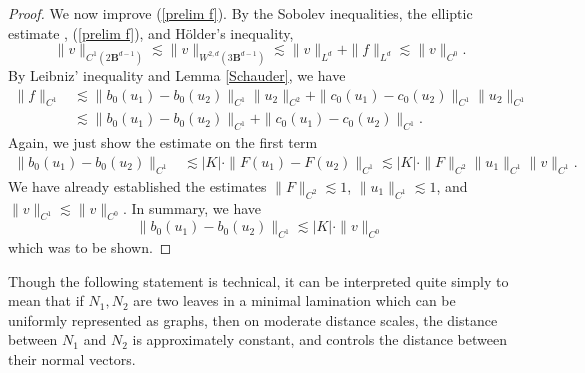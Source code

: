 \documentclass[reqno,11pt]{amsart}
\newcommand{\Ball}{\mathbf{B}}
\theoremstyle{definition}
\numberwithin{equation}{section}
\begin{document}
\begin{proof}
We now improve (\ref{prelim f}).
By the Sobolev inequalities, the elliptic estimate \cite[Theorem 9.11]{gilbarg2015elliptic}, (\ref{prelim f}), and H\"older's inequality,
$$\|v\|_{C^1(2\Ball^{d - 1})} \lesssim \|v\|_{W^{2, d}(3\Ball^{d - 1})} \lesssim \|v\|_{L^d} + \|f\|_{L^d} \lesssim \|v\|_{C^0}.$$
By Leibniz' inequality and Lemma \ref{Schauder}, we have 
\begin{align*}
\|f\|_{C^1} 
&\lesssim \|b_0(u_1) - b_0(u_2)\|_{C^1} \|u_2\|_{C^2} + \|c_0(u_1) - c_0(u_2)\|_{C^1} \|u_2\|_{C^1} \\
&\lesssim \|b_0(u_1) - b_0(u_2)\|_{C^1} + \|c_0(u_1) - c_0(u_2)\|_{C^1}.
\end{align*}
Again, we just show the estimate on the first term
\begin{align*}
\|b_0(u_1) - b_0(u_2)\|_{C^1}
&\lesssim |K| \cdot \|F(u_1) - F(u_2)\|_{C^1} \lesssim |K| \cdot \|F\|_{C^2} \|u_1\|_{C^1} \|v\|_{C^1}.
\end{align*}
We have already established the estimates $\|F\|_{C^2} \lesssim 1$, $\|u_1\|_{C^1} \lesssim 1$, and $\|v\|_{C^1} \lesssim \|v\|_{C^0}$.
In summary, we have
$$\|b_0(u_1) - b_0(u_2)\|_{C^1} \lesssim |K| \cdot \|v\|_{C^0}$$
which was to be shown.
\end{proof}

Though the following statement is technical, it can be interpreted quite simply to mean that if $N_1, N_2$ are two leaves in a minimal lamination which can be uniformly represented as graphs, then on moderate distance scales, the distance between $N_1$ and $N_2$ is approximately constant, and controls the distance between their normal vectors.
\end{document}

